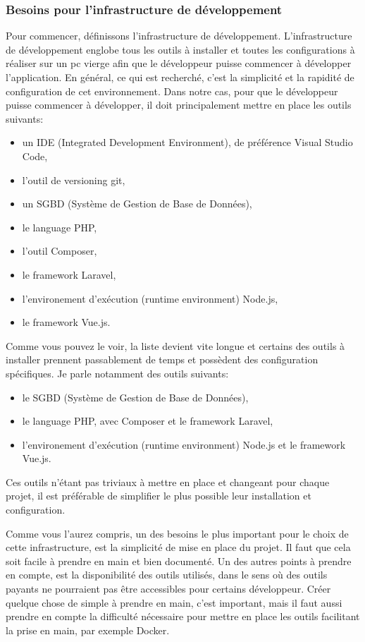 \documentclass[
    iai, %
    il, %
]{heig-tb}
\begin{document}
\subsubsection{Besoins pour l'infrastructure de développement}
Pour commencer, définissons l'infrastructure de développement.
L'infrastructure de développement englobe tous les outils à installer et toutes les configurations à réaliser sur un pc vierge afin que le développeur puisse commencer à développer l'application.
En général, ce qui est recherché, c'est la simplicité et la rapidité de configuration de cet environnement.
Dans notre cas, pour que le développeur puisse commencer à développer, il doit principalement mettre en place les outils suivants:
\begin{itemize}
    \item un IDE (Integrated Development Environment), de préférence Visual Studio Code,
    \item l'outil de versioning git,
    \item un SGBD (Système de Gestion de Base de Données), %
    \item le language PHP,
    \item l'outil Composer,
    \item le framework Laravel,
    \item l'environement d'exécution (runtime environment) Node.js,
    \item le framework Vue.js.
\end{itemize}
Comme vous pouvez le voir, la liste devient vite longue et certains des outils à installer prennent passablement de temps et possèdent des configuration spécifiques.
Je parle notamment des outils suivants:
\begin{itemize}
    \item le SGBD (Système de Gestion de Base de Données),
    \item le language PHP, avec Composer et le framework Laravel,
    \item l'environement d'exécution (runtime environment) Node.js et le framework Vue.js.
\end{itemize}
Ces outils n'étant pas triviaux à mettre en place et changeant pour chaque projet, il est préférable de simplifier le plus possible leur installation et configuration.

Comme vous l'aurez compris, un des besoins le plus important pour le choix de cette infrastructure, est la simplicité de mise en place du projet.
Il faut que cela soit facile à prendre en main et bien documenté.
Un des autres points à prendre en compte, est la disponibilité des outils utilisés, dans le sens où des outils payants ne pourraient pas être accessibles pour certains développeur.
Créer quelque chose de simple à prendre en main, c'est important, mais il faut aussi prendre en compte la difficulté nécessaire pour mettre en place les outils facilitant la prise en main, par exemple Docker.
\end{document}

